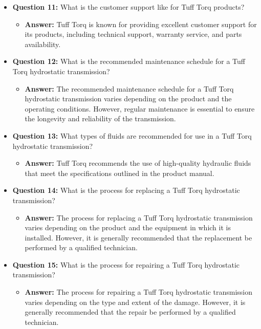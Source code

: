 \documentclass{article}
\begin{document}
\begin{itemize}
    \item \textbf{Question 11:} What is the customer support like for Tuff Torq products?
    \begin{itemize}
        \item \textbf{Answer:} Tuff Torq is known for providing excellent customer support for its products, including technical support, warranty service, and parts availability.
    \end{itemize}
    
    \item \textbf{Question 12:} What is the recommended maintenance schedule for a Tuff Torq hydrostatic transmission?
    \begin{itemize}
        \item \textbf{Answer:} The recommended maintenance schedule for a Tuff Torq hydrostatic transmission varies depending on the product and the operating conditions. However, regular maintenance is essential to ensure the longevity and reliability of the transmission.
    \end{itemize}
    
    \item \textbf{Question 13:} What types of fluids are recommended for use in a Tuff Torq hydrostatic transmission?
    \begin{itemize}
        \item \textbf{Answer:} Tuff Torq recommends the use of high-quality hydraulic fluids that meet the specifications outlined in the product manual.
    \end{itemize}
    
    \item \textbf{Question 14:} What is the process for replacing a Tuff Torq hydrostatic transmission?
    \begin{itemize}
        \item \textbf{Answer:} The process for replacing a Tuff Torq hydrostatic transmission varies depending on the product and the equipment in which it is installed. However, it is generally recommended that the replacement be performed by a qualified technician.
    \end{itemize}
    
    \item \textbf{Question 15:} What is the process for repairing a Tuff Torq hydrostatic transmission?
    \begin{itemize}
        \item \textbf{Answer:} The process for repairing a Tuff Torq hydrostatic transmission varies depending on the type and extent of the damage. However, it is generally recommended that the repair be performed by a qualified technician.
    \end{itemize}
    

\end{itemize}
\end{document}
